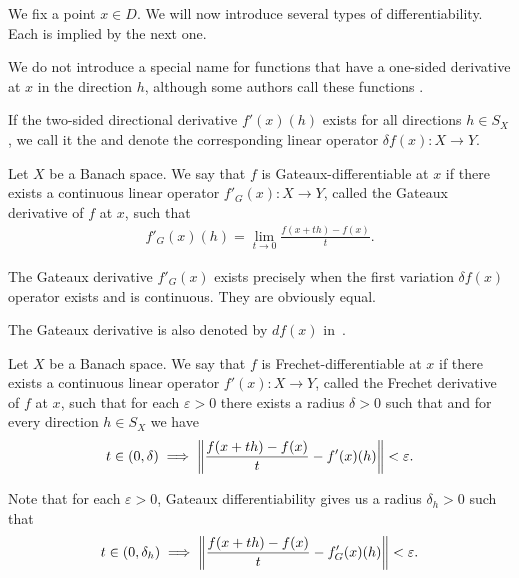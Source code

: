 \begin{definition}\label{def:differentiability}
  We fix a point $x \in D$. We will now introduce several types of differentiability. Each is implied by the next one.

  \begin{defenum}
    \item We do not introduce a special name for functions that have a one-sided derivative at $x$ in the direction $h$, although some authors call these functions . %

    \item\label{def:differentiability/two-sided}\cite[0.2.1]{Ioffe1974} If the two-sided directional derivative $f'(x)(h)$ exists for all directions $h \in S_X$, we call it the  and denote the corresponding linear operator $\delta f(x): X \to Y$.

    \item\label{def:differentiability/gateaux}\cite[definition 1.12]{Phelps1993} Let $X$ be a Banach space. We say that $f$ is Gateaux-differentiable at $x$ if there exists a continuous linear operator $f'_G(x): X \to Y$, called the Gateaux derivative of $f$ at $x$, such that
    \begin{align*}
      f'_G(x)(h) = \lim_{t \to 0} \frac {f(x + th) - f(x)} t.
    \end{align*}

    The Gateaux derivative $f'_G(x)$ exists precisely when the first variation $\delta f(x)$ operator exists and is continuous. They are obviously equal.

    The Gateaux derivative is also denoted by $df(x)$ in~\cite[definition 1.12]{Phelps1993}.

    \item\label{def:differentiability/frechet}\cite[definition 1.12]{Phelps1993} Let $X$ be a Banach space. We say that $f$ is Frechet-differentiable at $x$ if there exists a continuous linear operator $f'(x): X \to Y$, called the Frechet derivative of $f$ at $x$, such that for each $\varepsilon > 0$ there exists a radius $\delta > 0$ such that and for every direction $h \in S_X$ we have
    \begin{align*}
      t \in (0, \delta) \implies \left\Vert  \frac {f(x + th) - f(x)} t - f'(x)(h) \right\Vert < \varepsilon.
    \end{align*}

    Note that for each $\varepsilon > 0$, Gateaux differentiability gives us a radius $\delta_h > 0$ such that
    \begin{align*}
      t \in (0, \delta_h) \implies \left\Vert  \frac {f(x + th) - f(x)} t - f_G'(x)(h) \right\Vert < \varepsilon.
    \end{align*}


\end{defenum}
\end{definition}
